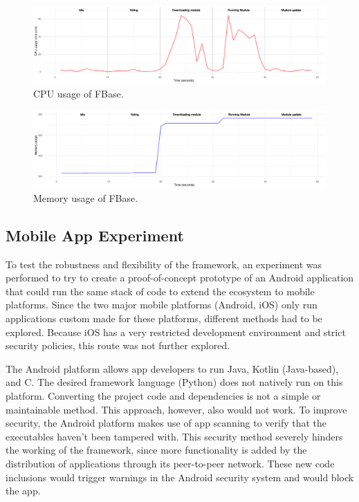 \begin{figure}[h]
	\centering
	\includegraphics[width=1\textwidth]{images/cpu.pdf}
	\caption{\label{fig:balance-scale} CPU usage of FBase.}
\end{figure}
\begin{figure}[h]
	\centering
	\includegraphics[width=1\textwidth]{images/mem.pdf}
	\caption{\label{fig:balance-scale} Memory usage of FBase.}
\end{figure}

\subsection{Mobile App Experiment}

To test the robustness and flexibility of the framework, an experiment was performed to try to create a proof-of-concept prototype of an Android application that could run the same stack of code to extend the ecosystem to mobile platforms. Since the two major mobile platforms (Android, iOS) only run applications custom made for these platforms, different methods had to be explored. Because iOS has a very restricted development environment and strict security policies, this route was not further explored.

The Android platform allows app developers to run Java, Kotlin (Java-based), and C. The desired framework language (Python) does not natively run on this platform. Converting the project code and dependencies is not a simple or maintainable method. This approach, however, also would not work. To improve security, the Android platform makes use of app scanning to verify that the executables haven't been tampered with. This security method severely hinders the working of the framework, since more functionality is added by the distribution of applications through its peer-to-peer network. These new code inclusions would trigger warnings in the Android security system and would block the app.

